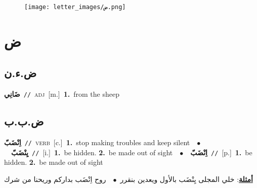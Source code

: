 \documentclass[10pt,a4paper,twoside]{article} %
\begin{document}
\begin{figure*}[t!]\centering\texttt{[image: letter\_images/ض.png]}\end{figure*}
\color{white}

 \section*{\foreignlanguage{arabic}{ض}} 
 \begin{multicols}{2} 

%
\color{black}
\vspace{-3mm}
\subsection*{\color{blue}\foreignlanguage{arabic}{ض.ء.ن}\color{blue}{}} 

{\setlength\topsep{0pt}\textbf{\foreignlanguage{arabic}{ضَانِي}}\ {\color{gray}\texttt{//}\color{black}}\ \textsc{adj}\ [m.]\ \textbf{1.}~from the sheep\ 

\vspace{-3mm}
\subsection*{\color{blue}\foreignlanguage{arabic}{ض.ب.ب}\color{blue}{}} 

{\setlength\topsep{0pt}\textbf{\foreignlanguage{arabic}{اِنْضَبّ}}\ {\color{gray}\texttt{//}\color{black}}\ \textsc{verb}\ [c.]\ \textbf{1.}~stop making troubles and keep silent\ \ $\bullet$\ \ \setlength\topsep{0pt}\textbf{\foreignlanguage{arabic}{يِنْضَبّ}}\ {\color{gray}\texttt{//}\color{black}}\ [i.]\ \textbf{1.}~be hidden.  \textbf{2.}~be made out of sight\ \ $\bullet$\ \ \setlength\topsep{0pt}\textbf{\foreignlanguage{arabic}{اِنْضَبّ}}\ {\color{gray}\texttt{//}\color{black}}\ [p.]\ \textbf{1.}~be hidden.  \textbf{2.}~be made out of sight\  \begin{flushright}\color{gray}\foreignlanguage{arabic}{\textbf{\underline{\foreignlanguage{arabic}{أمثلة}}}: خلي المجلى يِنْضَب بالأول ويعدين بنقرر\ $\bullet$\ \  روح اِنْضَب بداركم وريحنا من شرك}\end{flushright}\color{black}} \vspace{2mm}

}
\end{multicols}
\end{document}
